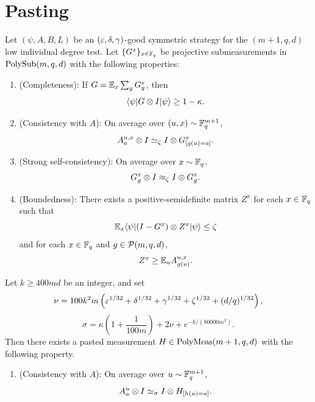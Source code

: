 \chapter{Pasting}
\label{chap:pasting}
\label{sec:ld-pasting}

\begin{theorem}[Pasting]\label{thm:ld-pasting}
	\leanok
	Let $(\psi,A,B,L)$ be an $(\varepsilon,\delta,\gamma)$-good symmetric strategy for the $(m+1,q,d)$ low individual degree test. Let $\{G^x\}_{x \in \mathbb{F}_q}$ be projective submeasurements in $\mathrm{PolySub}(m,q,d)$ with the following properties:
	\begin{enumerate}
		\item (Completeness): \label{item:ld-pasting-completeness}
		      If $G = \mathbb{E}_x \sum_g G_g^x$, then
		      \[
			      \langle \psi \rvert G \otimes I \lvert \psi \rangle \ge 1-\kappa.
		      \]
		\item (Consistency with $A$): \label{item:ld-pasting-consistency}
		      On average over $(u,x) \sim \mathbb{F}_q^{m+1}$,
		      \[
			      A_a^{u,x} \otimes I \simeq_\zeta I \otimes G^x_{[g(u)=a]}.
		      \]
		\item (Strong self-consistency): \label{item:ld-pasting-self-consistency}
		      On average over $x \sim \mathbb{F}_q$,
		      \[
			      G_g^x \otimes I \approx_\zeta I \otimes G_g^x.
		      \]
		\item (Boundedness): \label{item:ld-pasting-boundedness}
		      There exists a positive-semidefinite matrix $Z^x$ for each $x \in \mathbb{F}_q$ such that
		      \[
			      \mathbb{E}_x \langle \psi \rvert (I-G^x)\otimes Z^x \lvert \psi \rangle \le \zeta
		      \]
		      and for each $x \in \mathbb{F}_q$ and $g \in \mathcal{P}(m,q,d)$,
		      \[
			      Z^x \ge \mathbb{E}_u A^{u,x}_{g(u)}.
		      \]
	\end{enumerate}
	Let $k \ge 400md$ be an integer, and set
	\[
		\nu = 100k^2m\left(\varepsilon^{1/32}+\delta^{1/32}+\gamma^{1/32}+\zeta^{1/32}+(d/q)^{1/32}\right),
	\]
	\[
		\sigma = \kappa\left(1+\frac{1}{100m}\right) + 2\nu + e^{-k/(80000m^2)}.
	\]
	Then there exists a pasted measurement $H \in \mathrm{PolyMeas}(m+1,q,d)$ with the following property.
	\begin{enumerate}
		\item (Consistency with $A$): \label{item:ld-pasting-N-consistency}
		      On average over $u \sim \mathbb{F}_q^{m+1}$,
		      \[
			      A_a^u \otimes I \simeq_\sigma I \otimes H_{[h(u)=a]}.
		      \]
	\end{enumerate}
\end{theorem}
